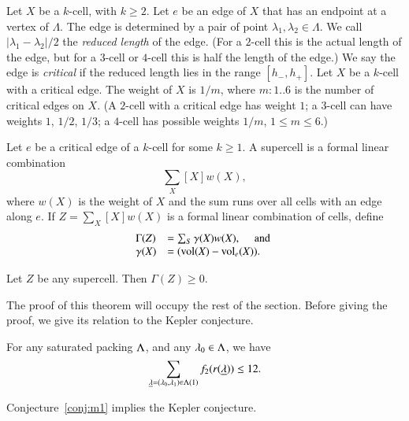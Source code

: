 \begin{definition}
Let $X$ be a $k$-cell, with $k\ge 2$.  Let $e$ be an edge of $X$ that
has an endpoint at a vertex of $\Lambda$.  The edge is determined by
a pair of point $\lambda_1,\lambda_2\in\Lambda$.  We call
$|\lambda_1-\lambda_2|/2$ the {\it reduced length} of the edge.
(For a $2$-cell this is the actual length of the edge, but for a $3$-cell
or $4$-cell this is half the length of the edge.)
We say the edge is {\it critical} if the reduced length lies in the
range $[h_-,h_+]$.
Let $X$ be a $k$-cell with a critical edge.  The weight of $X$  
is $1/m$, where $m:1..6$ is the
number of critical edges on $X$.
(A $2$-cell with a critical edge has weight $1$; a $3$-cell can have
weights $1$, $1/2$, $1/3$; a $4$-cell has possible weights $1/m$, $1\le m\le 6$.)
\end{definition}

\begin{definition}
Let $e$ be a critical edge of a $k$-cell for some $k\ge 1$.
A supercell is a formal linear combination
$$
\sum_X [X] w(X),
$$
where $w(X)$ is the weight of $X$ and the sum runs over all cells with an edge along $e$.  If $Z = \sum_X [X] w(X)$ is a formal linear combination of cells, define
$$
\begin{array}{lll}
\Gamma(Z) &= \sum_S \gamma(X) w(X),\quad\hbox{ and }\\
\gamma(X) &=  ({\operatorname{vol}}(X)-{\operatorname{vol}}_e(X)).
\end{array}
$$

\end{definition}

\begin{theorem}\label{lemma:superineq} 
Let $Z$ be any supercell.  Then $\Gamma(Z)\ge 0$.
\end{theorem}

The proof of this theorem will occupy the rest of the section.  Before giving the proof, we give its relation to the Kepler conjecture.


\begin{conjecture}\label{conj:m2} For any saturated packing $\Lambda$, and
any $\lambda_0\in\Lambda$, we have
\begin{equation}\label{eqn:f12}
\sum_{{\underline{\lambda}}=(\lambda_0,\lambda_1)\in\Lambda(1)} f_2(r({\underline{\lambda}})) \le 12.
\end{equation}
\end{conjecture}

\begin{theorem}\label{theorem:mk2}
Conjecture~\ref{conj:m1} implies the Kepler conjecture.
\end{theorem}

